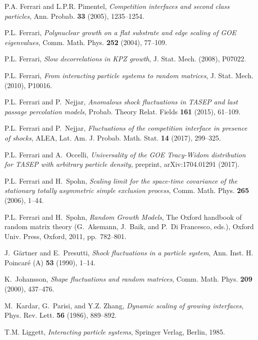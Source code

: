 \documentclass[12pt,a4paper]{article}
\numberwithin{equation}{section}
\begin{document}
\begin{thebibliography}{10}
P.A. Ferrari and L.P.R. Pimentel, \emph{Competition interfaces and second class
  particles}, Ann. Probab. \textbf{33} (2005), 1235--1254.

P.L. Ferrari, \emph{{Polynuclear growth on a flat substrate and edge scaling of
  GOE eigenvalues}}, Comm. Math. Phys. \textbf{252} (2004), 77--109.

P.L. Ferrari, \emph{{Slow decorrelations in KPZ growth}}, J. Stat. Mech.
  (2008), P07022.

P.L. Ferrari, \emph{{From interacting particle systems to random matrices}}, J.
  Stat. Mech. (2010), P10016.

P.L. Ferrari and P.~Nejjar, \emph{{Anomalous shock fluctuations in TASEP and
  last passage percolation models}}, Probab. Theory Relat. Fields \textbf{161}
  (2015), 61--109.

P.L. Ferrari and P.~Nejjar, \emph{{Fluctuations of the competition interface in
  presence of shocks}}, ALEA, Lat. Am. J. Probab. Math. Stat. \textbf{14}
  (2017), 299--325.

P.L. Ferrari and A.~Occelli, \emph{{Universality of the GOE Tracy-Widom
  distribution for TASEP with arbitrary particle density}}, preprint,
  arXiv:1704.01291 (2017).

P.L. Ferrari and H.~Spohn, \emph{Scaling limit for the space-time covariance of
  the stationary totally asymmetric simple exclusion process}, Comm. Math.
  Phys. \textbf{265} (2006), 1--44.

P.L. Ferrari and H.~Spohn, \emph{{Random Growth Models}}, The Oxford handbook
  of random matrix theory (G.~Akemann, J.~Baik, and P.~{Di Francesco}, eds.),
  Oxford Univ. Press, Oxford, 2011, pp.~782--801.

J.~G{\"a}rtner and E.~Presutti, \emph{Shock fluctuations in a particle system},
  Ann. Inst. H. Poincar{\'e} (A) \textbf{53} (1990), 1--14.

K.~Johansson, \emph{Shape fluctuations and random matrices}, Comm. Math. Phys.
  \textbf{209} (2000), 437--476.

M.~Kardar, G.~Parisi, and Y.Z. Zhang, \emph{Dynamic scaling of growing
  interfaces}, Phys. Rev. Lett. \textbf{56} (1986), 889--892.

T.M. Liggett, \emph{Interacting particle systems}, Springer Verlag, Berlin,
  1985.


\end{thebibliography}
\end{document}
